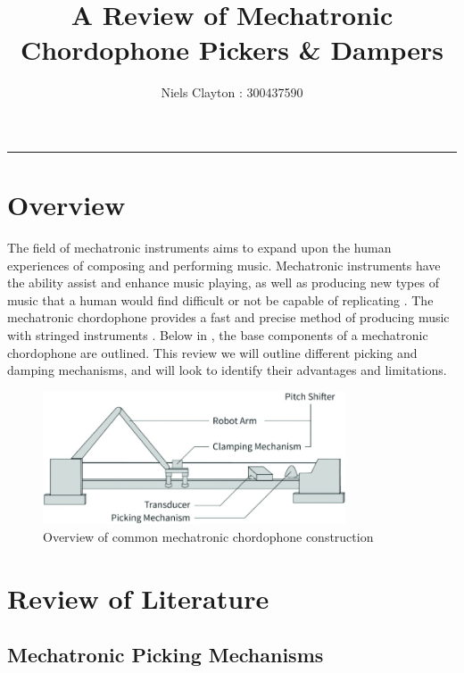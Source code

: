 \documentclass[a4paper,11pt]{article}
\begin{document}
\title{\LARGE{\textbf{A Review of Mechatronic Chordophone Pickers \& Dampers}}}
\author{Niels Clayton : 300437590}
\date{}
\maketitle
\hrule

\section{Overview}

The field of mechatronic instruments aims to expand upon the human experiences of composing and performing music. Mechatronic instruments have the ability assist and enhance music playing, as well as producing new types of music that a human would find difficult or not be capable of replicating \cite{Ogata2017}. The mechatronic chordophone provides a fast and precise method of producing music with stringed instruments \cite{YepezPlacencia2020}. Below in , the base components of a mechatronic chordophone are outlined. This review we will outline different picking and damping mechanisms, and will look to identify their advantages and limitations. 

\begin{figure}[h!]
  \begin{center}
    \includegraphics[width=0.8\textwidth]{chordophone_design.jpg}
    \caption{Overview of common mechatronic chordophone construction \cite{YepezPlacencia2020}}
    \label{F:basic_design}
  \end{center}
\end{figure}


\section{Review of Literature}
\subsection{Mechatronic Picking Mechanisms}
\end{document}
